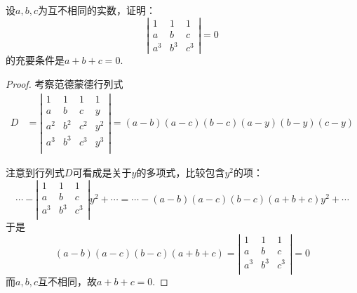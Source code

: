 \documentclass[10pt,a4paper%
tablecaptionabove]{article}
\newcommand{\cd}{\cdots}
\begin{document}
\begin{CJK}{UTF8}{gkai}
\begin{li}
  设$a,b,c$为互不相同的实数，证明：
  $$
  \left|
    \begin{array}{ccc}
      1   &   1   &   1\\
      a   &   b   &   c\\
      a^3 &   b^3 &   c^3
    \end{array}
  \right|=0
  $$
  的充要条件是$a+b+c=0$.
\end{li}
\begin{proof}
  考察范德蒙德行列式
  $$
  \begin{array}{ll}
    D & = \left|
        \begin{array}{cccc}
          1   &   1   &   1   & 1\\
          a   &   b   &   c   & y\\
          a^2 &   b^2 &   c^2 & y^2\\
          a^3 &   b^3 &   c^3 & y^3\\
        \end{array}
    \right|
    = (a-b)(a-c)(b-c)(a-y)(b-y)(c-y) 
  \end{array}
  $$
  
  注意到行列式$D$可看成是关于$y$的多项式，比较包含$y^2$的项：
  $$
  \cd - \left|
    \begin{array}{cccc}
      1   &   1   &   1  \\ 
      a   &   b   &   c  \\
      a^3 &   b^3 &   c^3\\
    \end{array}
  \right| y^2 + \cd = 
  \cd -(a-b)(a-c)(b-c)(a+b+c)y^2 + \cd 
  $$
  于是
  $$
  (a-b)(a-c)(b-c)(a+b+c) = \left|
    \begin{array}{cccc}
      1   &   1   &   1  \\ 
      a   &   b   &   c  \\
      a^3 &   b^3 &   c^3\\
    \end{array}
  \right|
  = 0
  $$
  而$a,b,c$互不相同，故$a+b+c=0$.
\end{proof}


\end{CJK}
\end{document}
